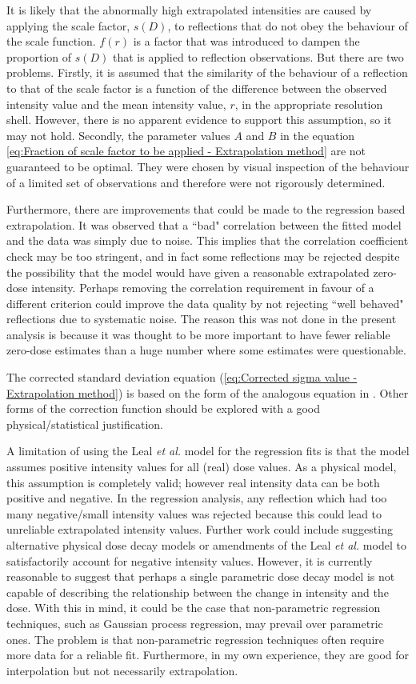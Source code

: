 It is likely that the abnormally high extrapolated intensities are caused by applying the scale factor, $s(D)$, to reflections that do not obey the behaviour of the scale function.
$f(r)$ is a factor that was introduced to dampen the proportion of $s(D)$ that is applied to reflection observations.
But there are two problems.
Firstly, it is assumed that the similarity of the behaviour of a reflection to that of the scale factor is a function of the difference between the observed intensity value and the mean intensity value, $r$, in the appropriate resolution shell.
However, there is no apparent evidence to support this assumption, so it may not hold.
Secondly, the parameter values $A$ and $B$ in the equation \ref{eq:Fraction of scale factor to be applied - Extrapolation method} are not guaranteed to be optimal.
They were chosen by visual inspection of the behaviour of a limited set of observations and therefore were not rigorously determined.

Furthermore, there are improvements that could be made to the regression based extrapolation.
It was observed that a ``bad" correlation between the fitted model and the data was simply due to noise.
This implies that the correlation coefficient check may be too stringent, and in fact some reflections may be rejected despite the possibility that the model would have given a reasonable extrapolated zero-dose intensity.
Perhaps removing the correlation requirement in favour of a different criterion could improve the data quality by not rejecting ``well behaved" reflections due to systematic noise.
The reason this was not done in the present analysis is because it was thought to be more important to have fewer reliable zero-dose estimates than a huge number where some estimates were questionable.

The corrected standard deviation equation (\ref{eq:Corrected sigma value - Extrapolation method}) is based on the form of the analogous equation in \cite{diederichs2003}.
Other forms of the correction function should be explored with a good physical/statistical justification.

A limitation of using the Leal \textit{et al.} model for the regression fits is that the model assumes positive intensity values for all (real) dose values.
As a physical model, this assumption is completely valid; however real intensity data can be both positive and negative.
In the regression analysis, any reflection which had too many negative/small intensity values was rejected because this could lead to unreliable extrapolated intensity values.
Further work could include suggesting alternative physical dose decay models or amendments of the Leal \textit{et al.} model to satisfactorily account for negative intensity values.
However, it is currently reasonable to suggest that perhaps a single parametric dose decay model is not capable of describing the relationship between the change in intensity and the dose.
With this in mind, it could be the case that non-parametric regression techniques, such as Gaussian process regression, may prevail over parametric ones.
The problem is that non-parametric regression techniques often require more data for a reliable fit.
Furthermore, in my own experience, they are good for interpolation but not necessarily extrapolation.

